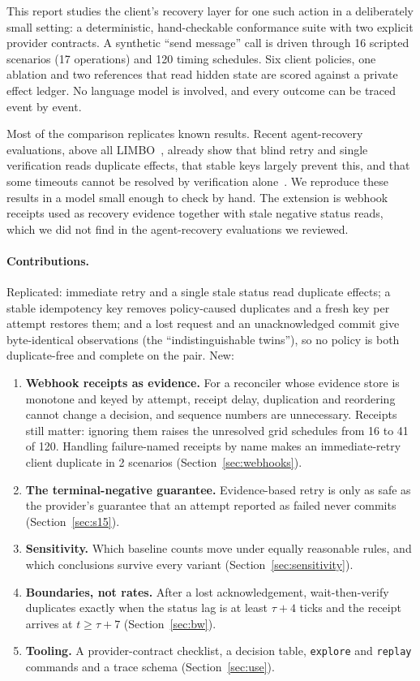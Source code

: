 \documentclass[11pt]{article}
\newcommand{\code}[1]{\texttt{#1}}
\begin{document}
This report studies the client's recovery layer for one such action in a deliberately small setting: a deterministic, hand-checkable conformance suite with two explicit provider contracts. A synthetic ``send message'' call is driven through 16 scripted scenarios (17 operations) and 120 timing schedules. Six client policies, one ablation and two references that read hidden state are scored against a private effect ledger. No language model is involved, and every outcome can be traced event by event.

Most of the comparison replicates known results. Recent agent-recovery evaluations, above all LIMBO~\cite{limbo}, already show that blind retry and single verification reads duplicate effects, that stable keys largely prevent this, and that some timeouts cannot be resolved by verification alone~\cite{limbo,didithappen,retrybench,permission,evidence}. We reproduce these results in a model small enough to check by hand. The extension is webhook receipts used as recovery evidence together with stale negative status reads, which we did not find in the agent-recovery evaluations we reviewed.

\paragraph{Contributions.} Replicated: immediate retry and a single stale status read duplicate effects; a stable idempotency key removes policy-caused duplicates and a fresh key per attempt restores them; and a lost request and an unacknowledged commit give byte-identical observations (the ``indistinguishable twins''), so no policy is both duplicate-free and complete on the pair. New:
\begin{enumerate}
  \item \textbf{Webhook receipts as evidence.} For a reconciler whose evidence store is monotone and keyed by attempt, receipt delay, duplication and reordering cannot change a decision, and sequence numbers are unnecessary. Receipts still matter: ignoring them raises the unresolved grid schedules from 16 to 41 of 120. Handling failure-named receipts by name makes an immediate-retry client duplicate in 2 scenarios (Section~\ref{sec:webhooks}).
  \item \textbf{The terminal-negative guarantee.} Evidence-based retry is only as safe as the provider's guarantee that an attempt reported as failed never commits (Section~\ref{sec:s15}).
  \item \textbf{Sensitivity.} Which baseline counts move under equally reasonable rules, and which conclusions survive every variant (Section~\ref{sec:sensitivity}).
  \item \textbf{Boundaries, not rates.} After a lost acknowledgement, wait-then-verify duplicates exactly when the status lag is at least $\tau+4$ ticks and the receipt arrives at $t \geq \tau+7$ (Section~\ref{sec:bw}).
  \item \textbf{Tooling.} A provider-contract checklist, a decision table, \code{explore} and \code{replay} commands and a trace schema (Section~\ref{sec:use}).
\end{enumerate}
\end{document}

